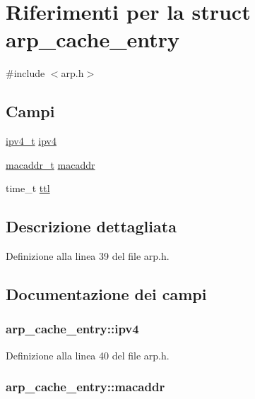\hypertarget{structarp__cache__entry}{\section{Riferimenti per la struct arp\+\_\+cache\+\_\+entry}
\label{structarp__cache__entry}
}


{\ttfamily \#include $<$arp.\+h$>$}

\subsection*{Campi}
\begin{DoxyCompactItemize}
\item 
\hyperlink{netif_8h_aea29db0d4ae23303ff7591af75c7b74a}{ipv4\+\_\+t} \hyperlink{structarp__cache__entry_a0347c9b0b7ec01ff4b5a2fb258ffc9d5}{ipv4}
\item 
\hyperlink{netif_8h_a95d524a06a1ff12a314f88bac04db658}{macaddr\+\_\+t} \hyperlink{structarp__cache__entry_abc5be464b787fc7c71a45330c9b979af}{macaddr}
\item 
time\+\_\+t \hyperlink{structarp__cache__entry_a9e7f6ce0108939a15edffff4aa0fdb5a}{ttl}
\end{DoxyCompactItemize}


\subsection{Descrizione dettagliata}


Definizione alla linea 39 del file arp.\+h.



\subsection{Documentazione dei campi}
\hypertarget{structarp__cache__entry_a0347c9b0b7ec01ff4b5a2fb258ffc9d5}{
\subsubsection[{ipv4}]{ arp\+\_\+cache\+\_\+entry\+::ipv4}}\label{structarp__cache__entry_a0347c9b0b7ec01ff4b5a2fb258ffc9d5}


Definizione alla linea 40 del file arp.\+h.

\hypertarget{structarp__cache__entry_abc5be464b787fc7c71a45330c9b979af}{
\subsubsection[{macaddr}]{ arp\+\_\+cache\+\_\+entry\+::macaddr}}\label{structarp__cache__entry_abc5be464b787fc7c71a45330c9b979af}


